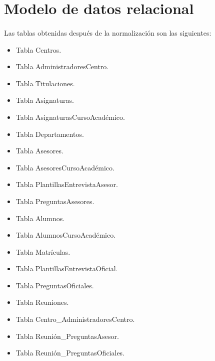 \section{Modelo de datos relacional}

  \paragraph{}Las tablas obtenidas después de la normalización son las
  siguientes:

  \begin{itemize}
   \item Tabla Centros.
   \item Tabla AdministradoresCentro.
   \item Tabla Titulaciones.
   \item Tabla Asignaturas.
   \item Tabla AsignaturasCursoAcadémico.
   \item Tabla Departamentos.
   \item Tabla Asesores.
   \item Tabla AsesoresCursoAcadémico.
   \item Tabla PlantillasEntrevistaAsesor.
   \item Tabla PreguntasAsesores.
   \item Tabla Alumnos.
   \item Tabla AlumnosCursoAcadémico.
   \item Tabla Matrículas.
   \item Tabla PlantillasEntrevistaOficial.
   \item Tabla PreguntasOficiales.
   \item Tabla Reuniones.
   \item Tabla Centro\_AdministradoresCentro.
   \item Tabla Reunión\_PreguntasAsesor.
   \item Tabla Reunión\_PreguntasOficiales.
  \end{itemize}

